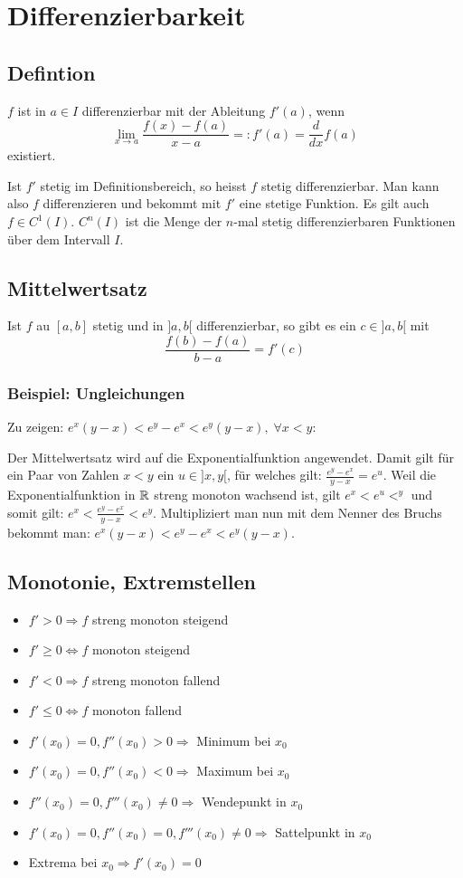 \section{Differenzierbarkeit}
\subsection{Defintion}
$f$ ist in $a \in I$ differenzierbar mit der Ableitung $f'(a)$, wenn
\[
\lim_{x \to a} \frac{f(x) - f(a)}{x - a} =: f'(a) = \frac{d}{dx}f(a)
\]
existiert.

Ist $f'$ stetig im Definitionsbereich, so heisst $f$ stetig differenzierbar. Man
kann also $f$ differenzieren und bekommt mit $f'$ eine stetige Funktion. Es gilt
auch $f \in C^1(I)$. $C^n(I)$ ist die Menge der $n$-mal stetig differenzierbaren
Funktionen über dem Intervall $I$.

\subsection{Mittelwertsatz}
Ist $f$ au $[a,b]$ stetig und in $]a, b[$ differenzierbar, so gibt es ein $c
\in ]a,b[$ mit
\[
\frac{f(b) - f(a)}{b-a} = f'(c)
\]

\subsubsection{Beispiel: Ungleichungen}
Zu zeigen: $e^x(y-x) < e^y - e^x < e^y(y-x), \; \forall x < y$:


Der Mittelwertsatz wird auf die Exponentialfunktion angewendet. Damit gilt für
ein Paar von Zahlen $x < y$ ein $u \in ]x,y[$, für welches gilt: $\frac{e^y
- e^x}{y-x} = e^u$. Weil die Exponentialfunktion in $\mathbb{R}$ streng monoton wachsend
ist, gilt $e^x < e^u <^y$ und somit gilt: $e^x < \frac{e^y-e^x}{y-x} < e^y$.
Multipliziert man nun mit dem Nenner des Bruchs bekommt man: $e^x (y-x) < e^y -
e^x < e^y(y-x)$.



\subsection{Monotonie, Extremstellen}
\begin{itemize}
  \item $f' > 0 \Rightarrow f$ streng monoton steigend
  \item $f' \geq 0 \Leftrightarrow f$ monoton steigend
  \item $f' < 0 \Rightarrow f$ streng monoton fallend
  \item $f' \leq 0 \Leftrightarrow f$ monoton fallend
  \item $f'(x_0) = 0, f''(x_0) > 0 \Rightarrow$ Minimum bei $x_0$
  \item $f'(x_0) = 0, f''(x_0) < 0 \Rightarrow$ Maximum bei $x_0$
  \item $f''(x_0) = 0, f'''(x_0) \neq 0 \Rightarrow$ Wendepunkt in $x_0$
  \item $f'(x_0) = 0, f''(x_0) = 0, f'''(x_0) \neq 0 \Rightarrow$ Sattelpunkt in
  $x_0$
  \item Extrema bei $x_0 \Rightarrow f'(x_0) = 0$
\end{itemize}